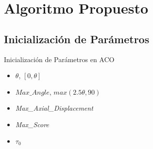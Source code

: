 

\section{Algoritmo Propuesto}
\subsection{Inicializaci\'on de Par\'ametros}
\begin{frame}{Inicializaci\'on de Par\'ametros en ACO}
    \begin{itemize}
        \item $\theta$, $[0, \theta]$
        \item $Max\_Angle$, $max(2.5\theta, 90)$
        \item {\it Max\_Axial\_Displacement}
        \item {\it Max\_Score}
        \item $\tau_0$
    \end{itemize}
\end{frame}

